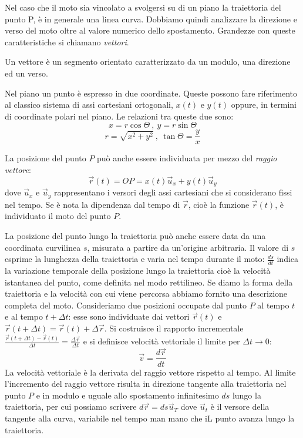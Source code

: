 \documentclass[class=book, crop=false, oneside, 12pt]{standalone}
\begin{document}
Nel caso che il moto sia vincolato a svolgersi su di un piano la traiettoria del punto P,
è in generale  una linea curva. Dobbiamo quindi analizzare la direzione e verso del moto oltre al valore numerico dello spostamento.
Grandezze con queste caratteristiche si chiamano \emph{vettori}.

Un vettore è un segmento orientato caratterizzato da un modulo, una direzione ed un verso.

Nel piano un punto è espresso in due coordinate. Queste possono fare riferimento al classico sistema di assi cartesiani ortogonali, 
\(x(t)\) e \(y(t)\) oppure, in termini di coordinate polari nel piano. 
Le relazioni tra queste due sono:
\begin{equation}
  x = r \cos \Theta \ , \ y = r \sin \Theta
\end{equation}
\begin{equation}
  r = \sqrt{x^2 + y^2 } \ , \ \tan \Theta = \frac{y}{x}
\end{equation}

La posizione del punto \(P\) può anche essere individuata per mezzo del \emph{raggio vettore}:
\begin{equation}
  \overrightarrow{r}(t) = OP = x(t) \overrightarrow{u}_x + y(t) \overrightarrow{u}_y
\end{equation}
dove \(\overrightarrow{u}_x\) e \(\overrightarrow{u}_y\) rappresentano i versori degli assi cartesiani che si considerano fissi nel tempo.
Se è nota la dipendenza dal tempo di \(\overrightarrow{r}\), cioè la funzione \(\overrightarrow{r}(t)\), è individuato il moto del punto \(P\).

La posizione del punto lungo la traiettoria può anche essere data da una coordinata curvilinea \(s\), misurata a partire da un'origine arbitraria. Il valore di \(s\) esprime la lunghezza della traiettoria e varia nel tempo durante il moto: \(\frac{ds}{dt}\) indica la variazione temporale della posizione lungo la traiettoria cioè la velocità istantanea del punto, come definita nel modo rettilineo. 
Se diamo la forma della traiettoria e la velocità con cui viene percorsa abbiamo fornito una descrizione completa del moto. 
Consideriamo due posizioni occupate dal punto \(P\) al tempo \(t\) e al tempo \(t + \Delta t\): esse sono individuate dai vettori \(\overrightarrow{r}(t)\) e \(\overrightarrow{r}(t + \Delta t) = \overrightarrow{r}(t) + \Delta \overrightarrow{r}\).
Si costruisce il rapporto incrementale \(\frac{\overrightarrow{r}(t+\Delta t) - \overrightarrow{r}(t)}{\Delta t} = \frac{\Delta \overrightarrow{r}}{\Delta t}\) e si definisce velocità vettoriale il limite per \(\Delta t \rightarrow 0\):
\begin{equation}
  \overrightarrow{v} = \frac{d \overrightarrow{r}}{dt}
\end{equation}
La velocità vettoriale è la derivata del raggio vettore rispetto al tempo. Al limite l'incremento del raggio vettore risulta in direzione tangente alla traiettoria nel punto \(P\) e in modulo e uguale allo spostamento infinitesimo \(ds\) lungo la traiettoria, per cui possiamo scrivere \(d \overrightarrow{r} = ds \overrightarrow{u}_T\) dove \(\overrightarrow{u}_t\) è il versore della tangente alla curva, variabile nel tempo man mano che iL punto avanza lungo la traiettoria.
\end{document}
